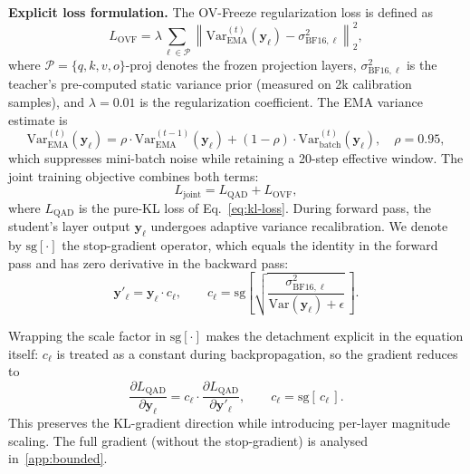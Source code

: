 \documentclass[final,5p,times,number]{elsarticle}
\begin{document}
\noindent\textbf{Explicit loss formulation.} The OV-Freeze regularization loss is defined as
\begin{equation}
\label{eq:ovf-loss}
L_{\mathrm{OVF}} = \lambda \sum_{\ell \in \mathcal{P}} \left\| \mathrm{Var}^{(t)}_{\mathrm{EMA}}(\bm{y}_\ell) - \sigma^2_{\mathrm{BF16},\ell} \right\|_2^2,
\end{equation}
where $\mathcal{P} = \{q, k, v, o\}\text{-proj}$ denotes the frozen projection layers, $\sigma^2_{\mathrm{BF16},\ell}$ is the teacher's pre-computed static variance prior (measured on 2k calibration samples), and $\lambda = 0.01$ is the regularization coefficient. The EMA variance estimate is
\begin{equation}
\label{eq:ema}
\mathrm{Var}^{(t)}_{\mathrm{EMA}}(\bm{y}_\ell) = \rho\cdot\mathrm{Var}^{(t-1)}_{\mathrm{EMA}}(\bm{y}_\ell) + (1-\rho)\cdot\mathrm{Var}^{(t)}_{\mathrm{batch}}(\bm{y}_\ell), \quad \rho = 0.95,
\end{equation}
which suppresses mini-batch noise while retaining a 20-step effective window. The joint training objective combines both terms:
\begin{equation}
\label{eq:joint}
L_{\mathrm{joint}} = L_{\mathrm{QAD}} + L_{\mathrm{OVF}},
\end{equation}
where $L_{\mathrm{QAD}}$ is the pure-KL loss of Eq.~\eqref{eq:kl-loss}. During forward pass, the student's layer output $\bm{y}_\ell$ undergoes adaptive variance recalibration. We denote by $\mathrm{sg}[\cdot]$ the stop-gradient operator, which equals the identity in the forward pass and has zero derivative in the backward pass:
\begin{equation}
\label{eq:ovf-rescale-en}
\bm{y}'_\ell = \bm{y}_\ell\cdot c_\ell, \qquad c_\ell = \mathrm{sg}\!\left[\sqrt{\frac{\sigma^2_{\mathrm{BF16},\ell}}{\mathrm{Var}(\bm{y}_\ell) + \epsilon}}\,\right].
\end{equation}

Wrapping the scale factor in $\mathrm{sg}[\cdot]$ makes the detachment explicit in the equation itself: $c_\ell$ is treated as a constant during backpropagation, so the gradient reduces to
\begin{equation}
\label{eq:ovf-detach-en}
\frac{\partial L_{\mathrm{QAD}}}{\partial\bm{y}_\ell} = c_\ell\cdot\frac{\partial L_{\mathrm{QAD}}}{\partial\bm{y}'_\ell}, \qquad c_\ell = \mathrm{sg}[\,c_\ell\,].
\end{equation}
This preserves the KL-gradient direction while introducing per-layer magnitude scaling. The full gradient (without the stop-gradient) is analysed in~\ref{app:bounded}.
\end{document}
